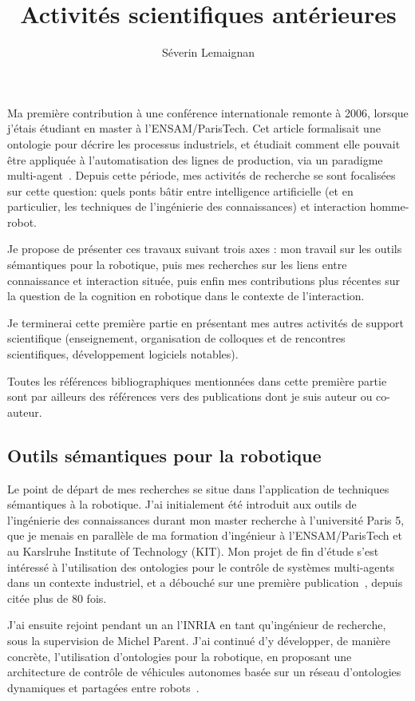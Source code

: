 \documentclass[a4paper]{article}
\title{Activités scientifiques antérieures}
\author{Séverin Lemaignan}
\date{}
\begin{document}
\maketitle

Ma première contribution à une conférence internationale remonte à 2006, lorsque
j'étais étudiant en master à l'ENSAM/ParisTech. Cet article formalisait une
ontologie pour décrire les processus industriels, et étudiait comment elle
pouvait être appliquée à l'automatisation des lignes de production, via un
paradigme multi-agent~\cite{lemaignan2006mason}. Depuis cette période, mes
activités de recherche se sont focalisées sur cette question: quels ponts bâtir
entre intelligence artificielle (et en particulier, les techniques de
l'ingénierie des connaissances) et interaction homme-robot.

Je propose de présenter ces travaux suivant trois axes : mon travail sur les
outils sémantiques pour la robotique, puis mes recherches sur les liens entre
connaissance et interaction située, puis enfin mes contributions plus récentes
sur la question de la cognition en robotique dans le contexte de l'interaction.

Je terminerai cette première partie en présentant mes autres activités de
support scientifique (enseignement, organisation de colloques et de rencontres
scientifiques, développement logiciels notables).

Toutes les références bibliographiques mentionnées dans cette première partie
sont par ailleurs des références vers des publications dont je suis auteur ou
co-auteur.

\subsection*{Outils sémantiques pour la robotique%
  \label{semantic-tools-for-robotics}%
}

Le point de départ de mes recherches se situe dans l'application de techniques
sémantiques à la robotique. J'ai initialement été introduit aux outils de
l'ingénierie des connaissances durant mon master recherche à l'université Paris
5, que je menais en parallèle de ma formation d'ingénieur à l'ENSAM/ParisTech et
au Karslruhe Institute of Technology (KIT). Mon projet de fin d'étude s'est
intéressé à l'utilisation des ontologies pour le contrôle de systèmes
multi-agents dans un contexte industriel, et a débouché sur une première
publication~\cite{lemaignan2006mason}, depuis citée plus de 80 fois.

J'ai ensuite rejoint pendant un an l'INRIA en tant qu'ingénieur de recherche,
sous la supervision de Michel Parent.  J'ai continué d'y développer, de manière
concrète, l'utilisation d'ontologies pour la robotique, en proposant une
architecture de contrôle de véhicules autonomes basée sur un réseau d'ontologies
dynamiques et partagées entre robots~\cite{mehani2007networking}.
\end{document}

